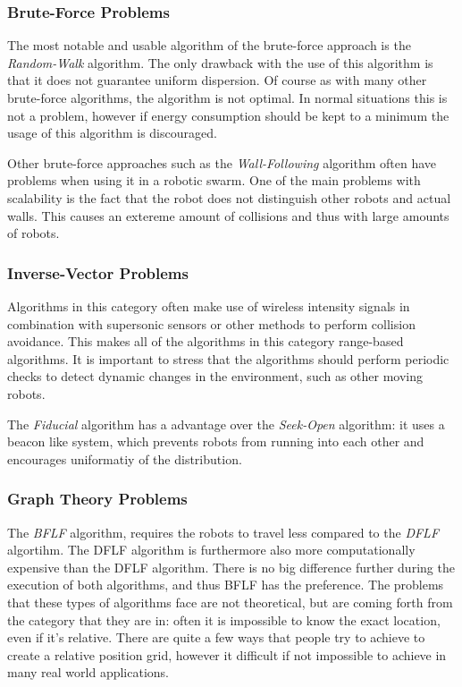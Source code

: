 \subsubsection{Brute-Force Problems}
The most notable and usable  algorithm of the brute-force approach is the \emph{Random-Walk} algorithm. 
The only drawback with the use of this algorithm is that it does not guarantee uniform dispersion.
Of course as with many other brute-force algorithms, the algorithm is not optimal.
In normal situations this is not a problem, however if energy consumption should be kept to a minimum the usage of this algorithm is discouraged.

Other brute-force approaches such as the \emph{Wall-Following} algorithm often have problems when using it in a robotic swarm. 
One of the main problems with scalability is the fact that the robot does not distinguish other robots and actual walls.
This causes an extereme amount of collisions and thus with large amounts of robots.

\subsubsection{Inverse-Vector Problems}
Algorithms in this category often make use of wireless intensity signals in combination with supersonic sensors or other methods to perform collision avoidance.
This makes all of the algorithms in this category range-based algorithms.
It is important to stress that the algorithms should perform periodic checks to detect dynamic changes in the environment, such as other moving robots. 

The \emph{Fiducial} algorithm has a advantage over the \emph{Seek-Open} algorithm: it uses a beacon like system, which prevents robots from running into each other and encourages uniformatiy of the distribution.

\subsubsection{Graph Theory Problems}
The \emph{BFLF} algorithm, requires the robots to travel less compared to the \emph{DFLF} algortihm. The DFLF algorithm is furthermore also more computationally expensive than the DFLF algorithm.
There is no big difference further during the execution of both algorithms, and thus BFLF has the preference.
The problems that these types of algorithms face are not theoretical, but are coming forth from the category that they are in: often it is impossible to know the exact location, even if it's relative.
There are quite a few ways that people try to achieve to create a relative position grid, however it difficult if not impossible to achieve in many real world applications.

